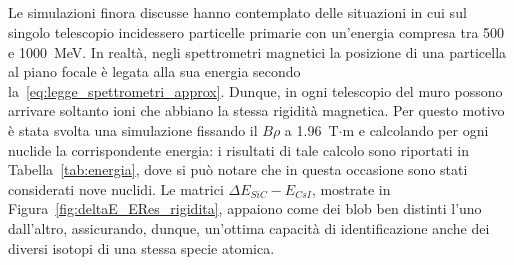 \subsection{}



Le simulazioni finora discusse hanno contemplato delle situazioni in cui sul singolo telescopio incidessero particelle primarie con un'energia compresa tra 500 e 1000~MeV.
In realtà, negli spettrometri magnetici la posizione di una particella al piano focale è legata alla sua energia secondo la~\ref{eq:legge_spettrometri_approx}.
Dunque, in ogni telescopio del muro possono arrivare soltanto ioni che abbiano la stessa rigidità magnetica.
Per questo motivo è stata svolta una simulazione fissando il $B \rho$ a 1.96~T$\cdot$m e calcolando per ogni nuclide la corrispondente energia: i risultati di tale calcolo sono riportati in Tabella~\ref{tab:energia}, dove si può notare che in questa occasione sono stati considerati nove nuclidi.
Le matrici $\Delta E_{SiC} - E_{CsI}$, mostrate in Figura~\ref{fig:deltaE_ERes_rigidita}, appaiono come dei blob ben distinti l'uno dall'altro, assicurando, dunque, un'ottima capacità di identificazione anche dei diversi isotopi di una stessa specie atomica.



